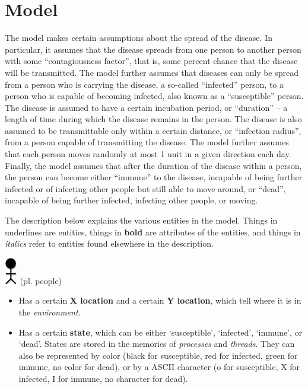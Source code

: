 \documentclass[letterpaper,10pt,openany,oneside]{sphinxmanual}
\begin{document}
\section{Model}
\label{0-Introduction/introduction:model}
The model makes certain assumptions about the spread of the disease. In
particular, it assumes that the disease spreads from one person to
another person with some “contagiousness factor”, that is, some percent
chance that the disease will be transmitted. The model further assumes
that diseases can only be spread from a person who is carrying the
disease, a so-called “infected” person, to a person who is capable of
becoming infected, also known as a “susceptible” person. The disease is
assumed to have a certain incubation period, or “duration” – a length of
time during which the disease remains in the person. The disease is also
assumed to be transmittable only within a certain distance, or
“infection radius”, from a person capable of transmitting the disease.
The model further assumes that each person moves randomly at most 1 unit
in a given direction each day. Finally, the model assumes that after the
duration of the disease within a person, the person can become either
“immune” to the disease, incapable of being further infected or of
infecting other people but still able to move around, or “dead”,
incapable of being further infected, infecting other people, or moving.

The description below explains the various entities in the model. Things
in underlines are entities, things in \textbf{bold} are attributes of the
entities, and things in \emph{italics} refer to entities found elsewhere in
the description.

\includegraphics{img-0.png} (pl. people)
\begin{itemize}
\item {} 
Has a certain \textbf{X location} and a certain \textbf{Y location}, which tell where it is in the \emph{environment}.

\item {} 
Has a certain \textbf{state}, which can be either ‘susceptible’, ‘infected’, ‘immune’, or ‘dead’. States are stored in the memories of \emph{processes} and \emph{threads}. They can also be represented by color (black for susceptible, red for infected, green for immune, no color for dead), or by a ASCII character (o for susceptible, X for infected, I for immune, no character for dead).

\end{itemize}
\end{document}
